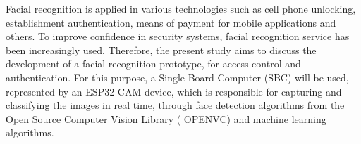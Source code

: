 
\begin{abstractutfpr}%
    Facial recognition is applied in various technologies such as cell phone unlocking, establishment authentication, means of payment for mobile applications and others. To improve confidence in security systems, facial recognition service has been increasingly used. Therefore, the present study aims to discuss the development of a facial recognition prototype, for access control and authentication. For this purpose, a Single Board Computer (SBC) will be used, represented by an ESP32-CAM device, which is responsible for capturing and classifying the images in real time, through face detection algorithms from the Open Source Computer Vision Library ( OPENVC) and machine learning algorithms.
\end{abstractutfpr}
